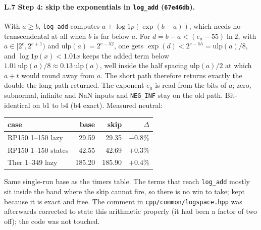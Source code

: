 \documentclass[11pt]{article}
\begin{document}
\paragraph{L.7 Step 4: skip the exponentials in \texttt{log\_add} (\texttt{67e46db}).} With $a \ge b$, \texttt{log\_add} computes $a + \log1p(\exp(b-a))$, which needs no transcendental at all when $b$ is far below $a$. For $d = b - a < (e_a - 55)\ln 2$, with $a \in [2^e, 2^{e+1})$ and $\mathrm{ulp}(a) = 2^{e-52}$, one gets $\exp(d) < 2^{e-55} = \mathrm{ulp}(a)/8$, and $\log1p(x) < 1.01x$ keeps the added term below $1.01\,\mathrm{ulp}(a)/8 \approx 0.13\,\mathrm{ulp}(a)$, well inside the half spacing $\mathrm{ulp}(a)/2$ at which $a + t$ would round away from $a$. The short path therefore returns exactly the double the long path returned. The exponent $e_a$ is read from the bits of $a$; zero, subnormal, infinite and NaN inputs and \texttt{NEG\_INF} stay on the old path. Bit-identical on b1 to b4 (b4 exact). Measured neutral:
\begin{center}
\begin{tabular}{@{}lrrr@{}}
\toprule
case & base & skip & $\Delta$ \\
\midrule
RP150 1--150 lazy & 29.59 & 29.35 & $-0.8\%$ \\
RP150 1--150 states & 42.55 & 42.69 & $+0.3\%$ \\
Ther 1--349 lazy & 185.20 & 185.90 & $+0.4\%$ \\
\bottomrule
\end{tabular}
\end{center}
Same single-run base as the timers table. The terms that reach \texttt{log\_add} mostly sit inside the band where the skip cannot fire, so there is no win to take; kept because it is exact and free. The comment in \texttt{cpp/common/logspace.hpp} was afterwards corrected to state this arithmetic properly (it had been a factor of two off); the code was not touched.
\end{document}

